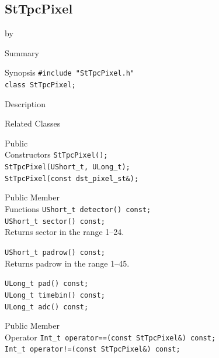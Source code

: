 \documentclass[twoside]{article}
\newcommand{\entrylabel}[1]{\mbox{\textbf{{#1}}}\hfil}%
\newenvironment{entry}
{\begin{list}{}%
    {\renewcommand{\makelabel}{\entrylabel}%
     \setlength{\labelwidth}{90pt}%
     \setlength{\leftmargin}{\labelwidth}
     \advance\leftmargin by \labelsep%
      }%
    }%
  {\end{list}}
\newcommand{\Entrylabel}[1]%
{\raisebox{0pt}[1ex][0pt]{\makebox[\labelwidth][l]%
    {\parbox[t]{\labelwidth}{\hspace{0pt}\textbf{{#1}}}}}}
\newenvironment{Entry}%
{\renewcommand{\entrylabel}{\Entrylabel}\begin{entry}}%
  {\end{entry}}
\begin{document}
\subsection{StTpcPixel}
\label{sec:StTpcPixel}
\begin{Entry}
\item[Summary] 
\item[Synopsis]
    \verb+#include "StTpcPixel.h"+\\
    \verb+class StTpcPixel;+\\
\item[Description]
\item[Related Classes]
\item[Public\\ Constructors]
    \verb+StTpcPixel();+\\
    \verb+StTpcPixel(UShort_t, ULong_t);+\\
    \verb+StTpcPixel(const dst_pixel_st&);+\\
\item[Public Member\\ Functions]
    \verb+UShort_t detector() const;+\\
    
    \verb+UShort_t sector() const;+\\
    Returns sector in the range 1--24.

    \verb+UShort_t padrow() const;+\\
    Returns padrow in the range 1--45.

    \verb+ULong_t pad() const;+\\
    \verb+ULong_t timebin() const;+\\
    \verb+ULong_t adc() const;+\\
\item[Public Member\\ Operator]
    \verb+Int_t operator==(const StTpcPixel&) const;+\\
    \verb+Int_t operator!=(const StTpcPixel&) const;+\\
\end{Entry}
\clearpage
\end{document}
